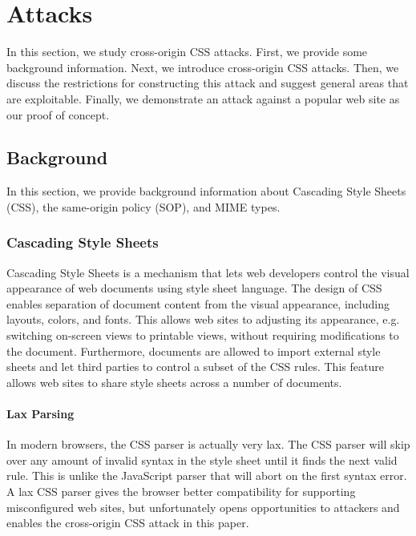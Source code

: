 \documentclass{acm_proc_article-sp}
\begin{document}
\section{Attacks}
In this section, we study cross-origin CSS attacks. First, we provide some background information. Next, we introduce cross-origin CSS attacks. Then, we discuss the restrictions for constructing this attack and suggest general areas that are exploitable. Finally, we demonstrate an attack against a popular web site as our proof of concept.

\subsection{Background}
In this section, we provide background information about Cascading Style Sheets (CSS), the same-origin policy (SOP), and MIME types.

\subsubsection{Cascading Style Sheets}
Cascading Style Sheets\cite{css} is a mechanism that lets web developers control the visual appearance of web documents using style sheet language. The design of CSS enables separation of document content from the visual appearance, including layouts, colors, and fonts. This allows web sites to adjusting its appearance, e.g. switching on-screen views to printable views, without requiring modifications to the document. Furthermore, documents are allowed to import external style sheets and let third parties to control a subset of the CSS rules. This feature allows web sites to share style sheets across a number of documents.

\paragraph{Lax Parsing}
In modern browsers, the CSS parser is actually very lax. The CSS parser will skip over any amount of invalid syntax in the style sheet until it finds the next valid rule. This is unlike the JavaScript parser that will abort on the first syntax error. A lax CSS parser gives the browser better compatibility for supporting misconfigured web sites, but unfortunately opens opportunities to attackers and enables the cross-origin CSS attack in this paper.
\end{document}
